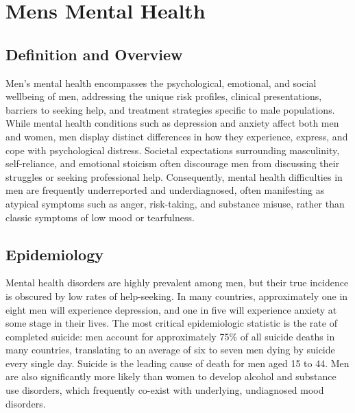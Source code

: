\chapter{Mens Mental Health}

\section*{Definition and Overview}
Men's mental health encompasses the psychological, emotional, and social wellbeing of men, addressing the unique risk profiles, clinical presentations, barriers to seeking help, and treatment strategies specific to male populations. While mental health conditions such as depression and anxiety affect both men and women, men display distinct differences in how they experience, express, and cope with psychological distress. Societal expectations surrounding masculinity, self-reliance, and emotional stoicism often discourage men from discussing their struggles or seeking professional help. Consequently, mental health difficulties in men are frequently underreported and underdiagnosed, often manifesting as atypical symptoms such as anger, risk-taking, and substance misuse, rather than classic symptoms of low mood or tearfulness.

\section*{Epidemiology}
Mental health disorders are highly prevalent among men, but their true incidence is obscured by low rates of help-seeking. In many countries, approximately one in eight men will experience depression, and one in five will experience anxiety at some stage in their lives. The most critical epidemiologic statistic is the rate of completed suicide: men account for approximately 75\% of all suicide deaths in many countries, translating to an average of six to seven men dying by suicide every single day. Suicide is the leading cause of death for men aged 15 to 44. Men are also significantly more likely than women to develop alcohol and substance use disorders, which frequently co-exist with underlying, undiagnosed mood disorders.

